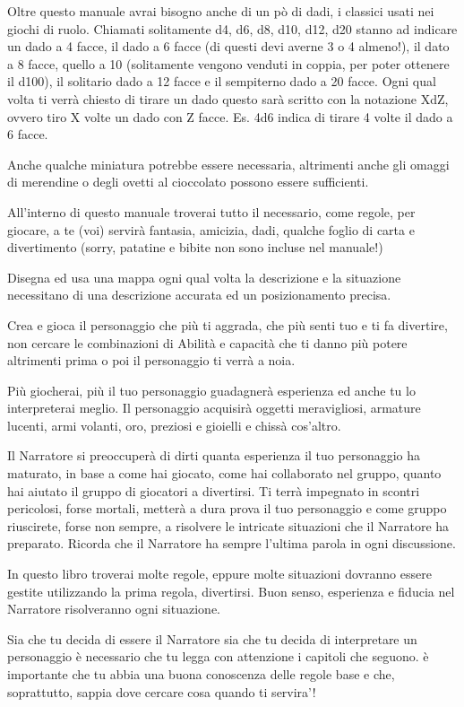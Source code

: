 \documentclass[a4paper,11pt,twoside,openany]{book}
\begin{document}
Oltre questo manuale avrai bisogno anche di un pò di dadi, i classici usati nei giochi di ruolo.
Chiamati solitamente d4, d6, d8, d10, d12, d20 stanno ad indicare un dado a 4 facce, il dado a 6 facce (di questi devi averne 3 o 4 almeno!), il dato a 8 facce, quello a 10 (solitamente vengono venduti in coppia, per poter ottenere il d100), il solitario dado a 12 facce e il sempiterno dado a 20 facce.
Ogni qual volta ti verrà chiesto di tirare un dado questo sarà scritto con la notazione XdZ, ovvero tiro X volte un dado con Z facce. Es. 4d6 indica di tirare 4 volte il dado a 6 facce.

Anche qualche miniatura potrebbe essere necessaria, altrimenti anche gli omaggi di merendine o degli ovetti al cioccolato possono essere sufficienti.

All'interno di questo manuale troverai tutto il necessario, come regole, per giocare, a te (voi) servirà fantasia, amicizia, dadi, qualche foglio di carta e divertimento (sorry, patatine e bibite non sono incluse nel manuale!)

Disegna ed usa una mappa ogni qual volta la descrizione e la situazione necessitano di una descrizione accurata ed un posizionamento precisa.

Crea e gioca il personaggio che più ti aggrada, che più senti tuo e ti fa divertire, non cercare le combinazioni di Abilità e capacità che ti danno più potere altrimenti prima o poi il personaggio ti verrà a noia.

Più giocherai, più il tuo personaggio guadagnerà esperienza ed anche tu lo interpreterai meglio. Il personaggio acquisirà oggetti meravigliosi, armature lucenti, armi volanti, oro, preziosi e gioielli e chissà cos'altro.

Il Narratore si preoccuperà di dirti quanta esperienza il tuo personaggio ha maturato, in base a come hai giocato, come hai collaborato nel gruppo, quanto hai aiutato il gruppo di giocatori a divertirsi. Ti terrà impegnato in scontri pericolosi, forse mortali, metterà a dura prova il tuo personaggio e come gruppo riuscirete, forse non sempre, a risolvere le intricate situazioni che il Narratore ha preparato. Ricorda che il Narratore ha sempre l'ultima parola in ogni discussione.

In questo libro troverai molte regole, eppure molte situazioni dovranno essere gestite utilizzando la prima regola, divertirsi. Buon senso, esperienza e fiducia nel Narratore risolveranno ogni situazione.

Sia che tu decida di essere il Narratore sia che tu decida di interpretare un personaggio è necessario che tu legga con attenzione i capitoli che seguono.
è importante che tu abbia una buona conoscenza delle regole base e che, soprattutto, sappia dove cercare cosa quando ti servira'!
\end{document}
